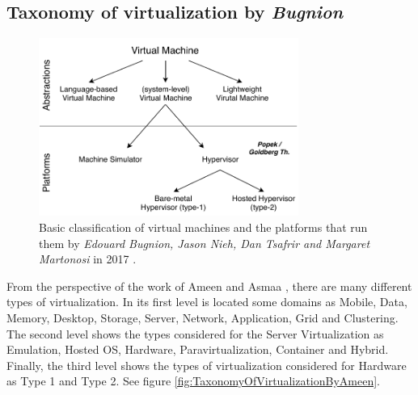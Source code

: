 	\subsection{Taxonomy of virtualization by \textit{Bugnion}}
	
	\begin{figure}[H]
		\centering
		\includegraphics[width=8.5cm]{images/Bugnion2017.pdf}
		\vspace{-0.2cm}
		\caption{Basic classification of virtual machines and the platforms that run them by \textit{Edouard Bugnion, Jason Nieh, Dan Tsafrir and Margaret Martonosi} in 2017 \cite{Bugnion2017}.}
		\label{fig:TaxonomyOfVirtualizationBugnion}
	\end{figure}
	
    From the perspective of the work of Ameen and Asmaa \cite{Ameen2013}, there are many different types of virtualization. In its first level is located some domains as  Mobile, Data, Memory, Desktop, Storage, Server, Network, Application, Grid and Clustering. The second level shows the types considered for the Server Virtualization as Emulation, Hosted OS, Hardware, Paravirtualization, Container and Hybrid. Finally, the third level shows the types of virtualization considered for Hardware as Type 1 and Type 2. See figure \ref{fig:TaxonomyOfVirtualizationByAmeen}.
  
